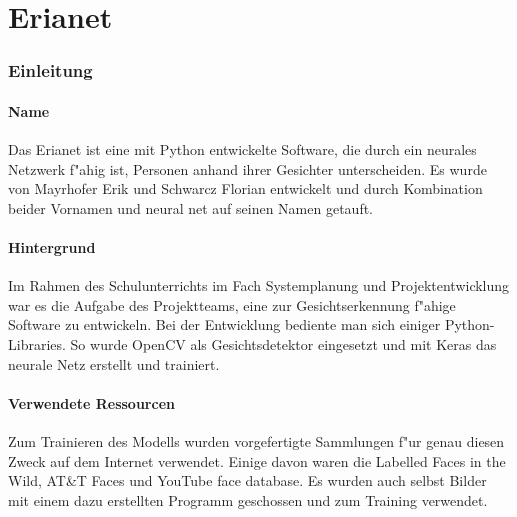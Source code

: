 \documentclass[12pt]{article}
\begin{document}
\ofoot{\pagemark}

\tableofcontents
\newpage

\part{Erianet}
\section{Einleitung}
\subsection{Name}
Das Erianet ist eine mit Python entwickelte Software, die
durch ein neurales Netzwerk f"ahig ist,
Personen anhand ihrer Gesichter unterscheiden.
Es wurde von Mayrhofer Erik und Schwarcz Florian
entwickelt und durch Kombination beider Vornamen und {\glqq}neural net{\grqq}
auf seinen Namen getauft.
\subsection{Hintergrund}
Im Rahmen des Schulunterrichts im Fach {\glqq}Systemplanung und Projektentwicklung{\grqq}
war es die Aufgabe des Projektteams, eine zur Gesichtserkennung
f"ahige Software zu entwickeln.
Bei der Entwicklung bediente man sich einiger Python-Libraries.
So wurde OpenCV als Gesichtsdetektor eingesetzt und mit Keras das neurale
Netz erstellt und trainiert.
\subsection{Verwendete Ressourcen}
Zum Trainieren des Modells wurden vorgefertigte Sammlungen f"ur genau diesen
Zweck auf dem Internet verwendet. Einige davon waren die {\glqq}Labelled Faces in the Wild{\grqq},
{\glqq}AT\&T Faces{\grqq} und {\glqq}YouTube face database{\grqq}. Es wurden
auch selbst Bilder mit einem dazu erstellten Programm geschossen und zum Training verwendet.
\newpage
\end{document}
